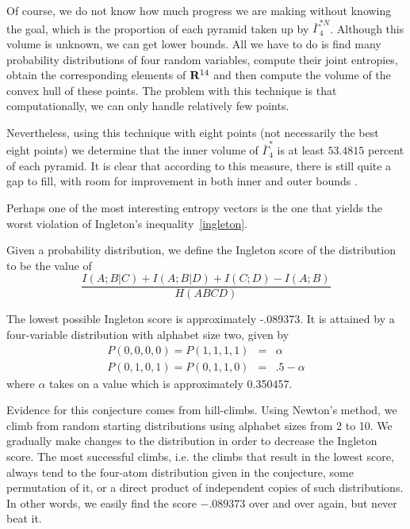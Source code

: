 \documentclass[10pt,journal]{IEEEtran}
\begin{document}
Of course, we do not know how much progress we are making without knowing the goal, which is
the proportion of each pyramid taken up by $\bar\Gamma^{*N}_4$.
Although this volume is unknown, we can get lower bounds.
All we have to do is find many probability distributions of four random variables, compute their joint entropies,
obtain the corresponding elements of $\mathbf{R}^{14}$ and
then compute the volume of the convex hull of these points.
The problem with this technique is that computationally, we can only handle relatively few points.

Nevertheless, using this technique with eight points (not necessarily the best eight points)
 we determine that the inner volume of
$\bar\Gamma^*_4$ is at least $53.4815 $ percent of each pyramid.  It is clear that according to this measure, there is still quite a gap
to fill, with room for improvement in both inner and outer bounds .

Perhaps one of the most interesting entropy vectors is the one that yields the worst violation of Ingleton's inequality~\eqref{ingleton}.
\begin{definition}
Given a probability distribution, we define the Ingleton score of the distribution to be the value of
$$
\frac{I(A;B|C)+I(A;B|D)+I(C;D)-I(A;B)}{H(ABCD)}
$$
\end{definition}

\begin{conjecture}
The lowest possible Ingleton score is approximately -.089373.  It is attained by a four-variable
distribution with alphabet size two, given by
\begin{eqnarray*}
P(0,0,0,0)=P(1,1,1,1)&=&\alpha\\
P(0,1,0,1)=P(0,1,1,0)&=&.5-\alpha
\end{eqnarray*}
where $\alpha$ takes on a value which is approximately 0.350457.
\end{conjecture}

Evidence for this conjecture comes from hill-climbs.  Using Newton's method, we climb from random starting distributions
using alphabet sizes from 2 to 10.  We gradually make changes to the distribution in order to
decrease the Ingleton score.  The most successful climbs, i.e. the climbs that result
 in the lowest score, always tend to the four-atom distribution given in
the conjecture, some permutation of it, or a direct product of independent copies of such distributions.
In other words, we easily find the score $-.089373$ over and over again, but never beat it.
\end{document}
